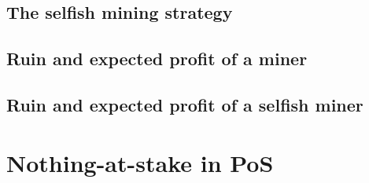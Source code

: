 \subsection{The selfish mining strategy}\label{ssec:selfish_mining}
\subsection{Ruin and expected profit of a miner}\label{ssec:selfish_mining}
\subsection{Ruin and expected profit of a selfish miner}\label{ssec:selfish_mining}

\section{Nothing-at-stake in PoS}\label{sec:NaS}
\newpage